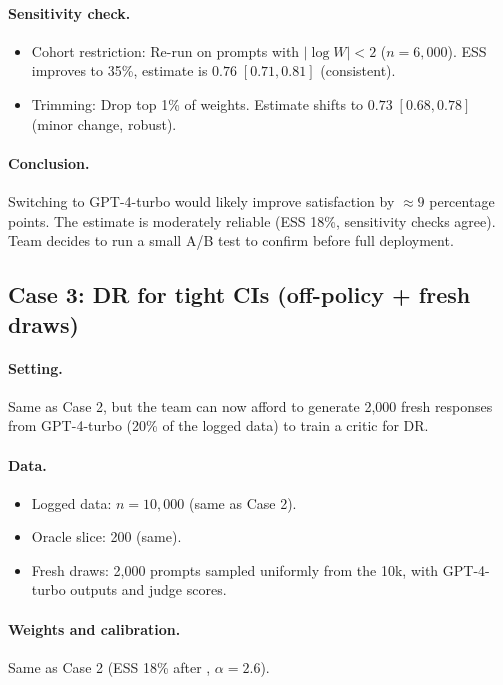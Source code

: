 \paragraph{Sensitivity check.}
\begin{itemize}
\item Cohort restriction: Re-run on prompts with $|\log W| < 2$ ($n = 6{,}000$). ESS improves to 35\%, estimate is $0.76 \; [0.71, 0.81]$ (consistent).
\item Trimming: Drop top 1\% of weights. Estimate shifts to $0.73 \; [0.68, 0.78]$ (minor change, robust).
\end{itemize}

\paragraph{Conclusion.} Switching to GPT-4-turbo would likely improve satisfaction by $\approx 9$ percentage points. The estimate is moderately reliable (ESS 18\%, sensitivity checks agree). Team decides to run a small A/B test to confirm before full deployment.

\subsection{Case 3: DR for tight CIs (off-policy + fresh draws)}

\paragraph{Setting.} Same as Case 2, but the team can now afford to generate 2,000 fresh responses from GPT-4-turbo (20\% of the logged data) to train a critic for DR.

\paragraph{Data.}
\begin{itemize}
\item Logged data: $n = 10{,}000$ (same as Case 2).
\item Oracle slice: 200 (same).
\item Fresh draws: 2,000 prompts sampled uniformly from the 10k, with GPT-4-turbo outputs and judge scores.
\end{itemize}

\paragraph{Weights and calibration.} Same as Case 2 (ESS 18\% after \simcal, $\alpha = 2.6$).

